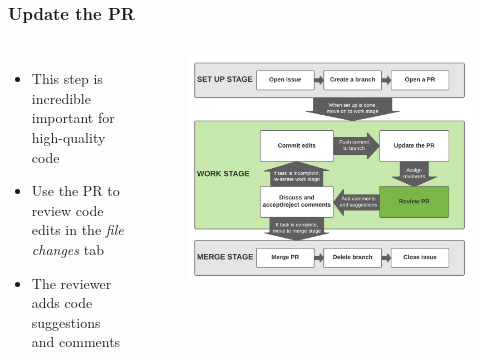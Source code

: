 \documentclass[aspectratio=169]{beamer} %
\begin{document}
\begin{frame}
	\frametitle{Update the PR}
	\begin{columns}[c]
		
		\begin{itemize}
			\setlength\itemsep{1em}
			\item This step is incredible important for high-quality code
			\item Use the PR to review code edits in the \textit{file changes} tab
			\item The reviewer adds code suggestions and comments
		\end{itemize}
		
		\vspace{-.75cm}
		\begin{figure}
			\centering
			\includegraphics[width=\textwidth]{./img/branch-pr-merge-cycle-S2-3.png}
		\end{figure}
		
	\end{columns}
\end{frame}
\end{document}
